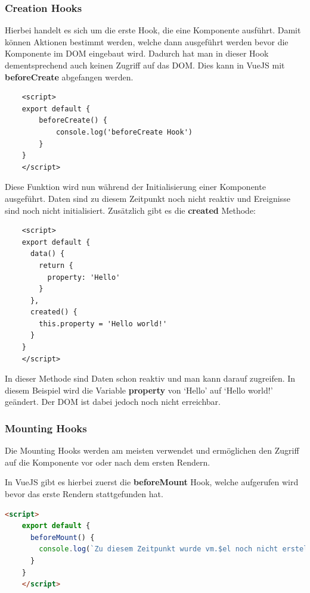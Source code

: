 \subsubsection{Creation Hooks}
Hierbei handelt es sich um die erste Hook, die eine Komponente ausführt. Damit können Aktionen bestimmt werden, welche dann ausgeführt werden bevor die Komponente im DOM eingebaut wird. Dadurch hat man in dieser Hook dementsprechend auch keinen Zugriff auf das DOM.
Dies kann in VueJS mit \textbf{beforeCreate} abgefangen werden.

\begin{lstlisting}
    <script>
    export default {
    	beforeCreate() {
    		console.log('beforeCreate Hook')
    	}
    }
    </script>
\end{lstlisting}

Diese Funktion wird nun während der Initialisierung einer Komponente ausgeführt. Daten sind zu diesem Zeitpunkt noch nicht reaktiv und Ereignisse sind noch nicht initialisiert.
Zusätzlich gibt es die \textbf{created} Methode:

\begin{lstlisting}
    <script>
    export default {
      data() {
        return {
          property: 'Hello'
        }
      },
      created() {
        this.property = 'Hello world!'
      }
    }
    </script>
\end{lstlisting}

In dieser Methode sind Daten schon reaktiv und man kann darauf zugreifen. In diesem Beispiel wird die Variable \textbf{property} von ‘Hello’ auf ‘Hello world!’ geändert. Der DOM ist dabei jedoch noch nicht erreichbar.
\cite{frontend_web_vuejs_lifecycle}
\newpage

\subsubsection{Mounting Hooks}
Die Mounting Hooks werden am meisten verwendet und ermöglichen den Zugriff auf die Komponente vor oder nach dem ersten Rendern.

In VueJS gibt es hierbei zuerst die \textbf{beforeMount} Hook, welche aufgerufen wird bevor das erste Rendern stattgefunden hat.

\begin{lstlisting}[language=html]
    <script>
    export default {
      beforeMount() {
        console.log(`Zu diesem Zeitpunkt wurde vm.$el noch nicht erstellt.`)
      }
    }
    </script>
\end{lstlisting}

